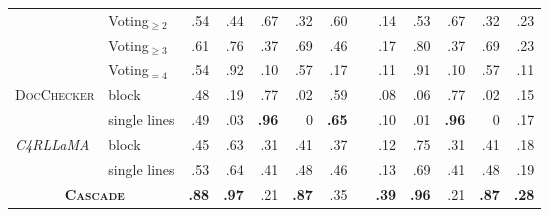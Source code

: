 \documentclass[acmsmall, screen]{acmart}
\newcommand{\tool}{\textsc{Cascade}\xspace}
\begin{document}
\begin{table}[tb]
\begin{tabular}{@{}llrrrrrrrrrrr@{}}
                                                                                 & Voting$_{\geq2}$     & .54     & .44     & .67    & .32          & .60   &                      & .14     & .53     & .67    & .32          & .23   \\
                                                                                 & Voting$_{\geq3}$     & .61     & .76     & .37    & .69          & .46   &                      & .17     & .80     & .37    & .69          & .23   \\
                                                                                 & Voting$_{=4}$        & .54     & .92     & .10    & .57          & .17   &                      & .11     & .91     & .10    & .57          & .11   \\
\multirow{2}{*}{\textsc{DocChecker}}                            & block                & .48     & .19     & .77    & .02          & .59   &                      & .08     & .06     & .77    & .02          & .15   \\
                                                                                 & single lines         & .49     & .03     & \textbf{.96}    & 0            & \textbf{.65}   &                      & .10     & .01     & \textbf{.96}    & 0            & .17   \\
\multirow{2}{*}{\textit{C4RLLaMA}}                                               & block                & .45     & .63     & .31    & .41          & .37   &                      & .12     & .75     & .31    & .41          & .18   \\
                                                                                 & single lines         & .53     & .64     & .41    & .48          & .46   &                      & .13     & .69     & .41    & .48          & .19   \\ \midrule
\multicolumn{2}{c}{\textbf{\tool}}    & \textbf{.88}     & \textbf{.97}     & .21    & \textbf{.87}          & .35   &                      & \textbf{.39}     & \textbf{.96}     & .21    &\textbf{ .87}          & \textbf{.28 }  \\ \bottomrule
\end{tabular}
\end{table}
\end{document}
